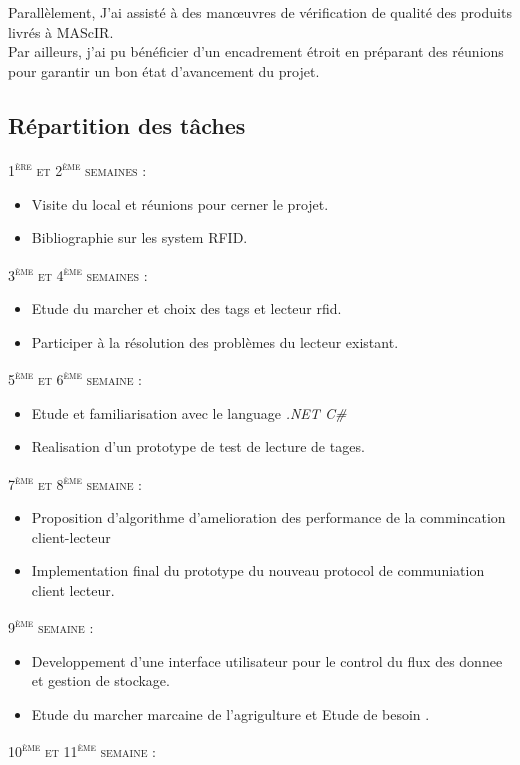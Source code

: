 \documentclass[11pt, a4paper, twoside]{book}
\begin{document}
Parallèlement, J’ai assisté à des manœuvres de vérification de qualité des produits livrés à MAScIR.\\

Par ailleurs, j’ai pu bénéficier d’un encadrement étroit en préparant des réunions pour garantir un bon état d’avancement du projet.

\subsection{Répartition des tâches}
\noindent
\textsc{1\textsuperscript{ère} et 2\textsuperscript{ème} semaines :}
\begin{itemize}
\item Visite du local et réunions pour cerner le projet.
\item Bibliographie sur les system RFID.
\end{itemize}
\textsc{3\textsuperscript{ème} et 4\textsuperscript{ème} semaines :}
\begin{itemize}
\item Etude du marcher et choix des tags et lecteur rfid.
\item Participer à la résolution des problèmes du lecteur existant.
\end{itemize}
\textsc{5\textsuperscript{ème} et 6\textsuperscript{ème} semaine :}
\begin{itemize}
\item Etude et familiarisation avec le language \emph{.NET C\#}
\item Realisation d'un prototype de test de lecture de tages.
\end{itemize}
\textsc{7\textsuperscript{ème} et 8\textsuperscript{ème} semaine :}
\begin{itemize}
\item Proposition d'algorithme d'amelioration des performance de la commincation client-lecteur
\item Implementation final du prototype du nouveau protocol de communiation client lecteur.
\end{itemize}
\textsc{9\textsuperscript{ème} semaine :}
\begin{itemize}
\item Developpement d'une interface utilisateur pour le control du flux des donnee et gestion de stockage.
\item Etude du marcher marcaine de l'agrigulture et Etude de besoin .
\end{itemize}
\textsc{10\textsuperscript{ème} et 11\textsuperscript{ème} semaine :}
\end{document}
